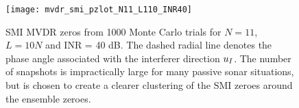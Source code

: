 
\begin{figure}[!hp]
  \centering
  \texttt{[image: mvdr\_smi\_pzlot\_N11\_L110\_INR40]}
  \caption[SMI MVDR zeros from 1000 Monte Carlo trials for $N = 11$, $L =
  10 N$ and INR = $40$ dB]{SMI MVDR zeros from 1000 Monte Carlo trials
    for $N = 11$, $L = 10N$ and INR = 40 dB. The dashed radial line
    denotes the phase angle associated with the interferer direction
    $u_I$. The number of snapshots is impractically large for many
    passive sonar situations, but is chosen to create a clearer
    clustering of the SMI zeroes around the ensemble zeroes.}
  \label{fig:smi-mvdr-pzplot}
\end{figure}

